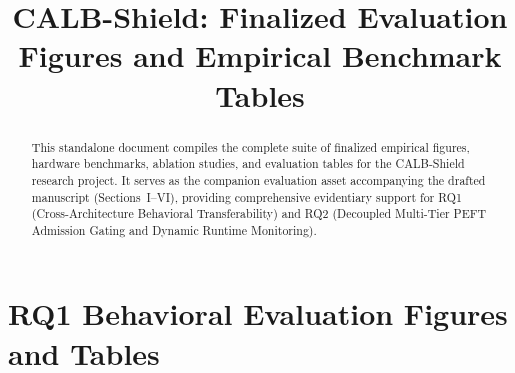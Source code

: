 \documentclass[conference]{IEEEtran}
\begin{document}
\title{CALB-Shield: Finalized Evaluation Figures and Empirical Benchmark Tables}
\author{
\and
{}
\and
{}
}

\maketitle

\begin{abstract}
This standalone document compiles the complete suite of finalized empirical figures, hardware benchmarks, ablation studies, and evaluation tables for the CALB-Shield research project. It serves as the companion evaluation asset accompanying the drafted manuscript (Sections~I--VI), providing comprehensive evidentiary support for RQ1 (Cross-Architecture Behavioral Transferability) and RQ2 (Decoupled Multi-Tier PEFT Admission Gating and Dynamic Runtime Monitoring).
\end{abstract}

\section{RQ1 Behavioral Evaluation Figures and Tables}
\end{document}

